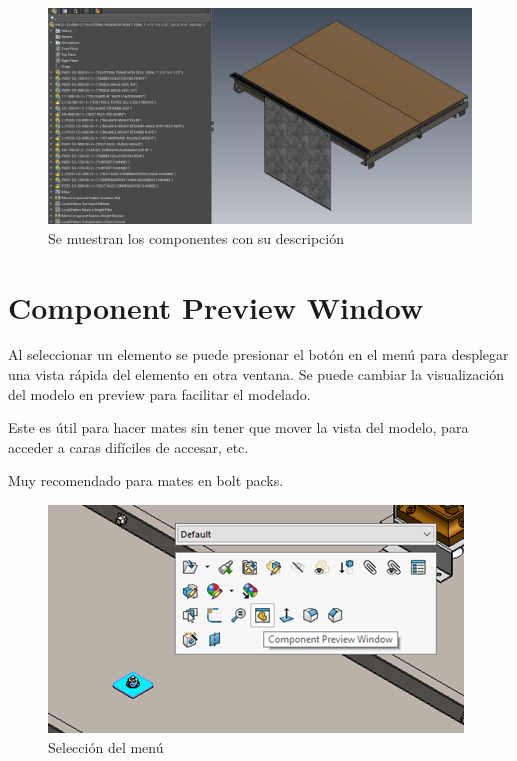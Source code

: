 \documentclass[12pt,letterpaper,final]{report}
\begin{document}
\begin{figure}[H]
	\centering
	\includegraphics[width=0.85\linewidth, height=0.5\textheight,keepaspectratio]{Imagenes/solidworks_treedisplay03}
	\caption{Se muestran los componentes con su descripción}
	\label{fig:solidworkstreedisplay03}
\end{figure}

\chapter{Component Preview Window}

Al seleccionar un elemento se puede presionar el botón en el menú para desplegar una vista rápida del elemento en otra ventana. Se puede cambiar la visualización del modelo en preview para facilitar el modelado.

Este es útil para hacer mates sin tener que mover la vista del modelo, para acceder a caras difíciles de accesar, etc.

Muy recomendado para mates en bolt packs.

\begin{figure}[H]
	\centering
	\includegraphics[width=0.85\linewidth, height=0.5\textheight,keepaspectratio]{Imagenes/solidworks_componentpreview_01}
	\caption{Selección del menú}
	\label{fig:solidworkscomponentpreview01}
\end{figure}
\end{document}
